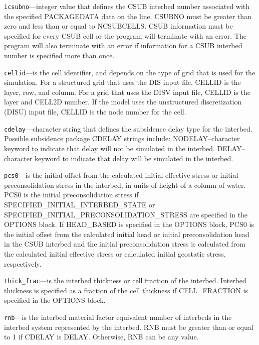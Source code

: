 \begin{description}
\item \texttt{icsubno}---integer value that defines the CSUB interbed number associated with the specified PACKAGEDATA data on the line. CSUBNO must be greater than zero and less than or equal to NCSUBCELLS.  CSUB information must be specified for every CSUB cell or the program will terminate with an error.  The program will also terminate with an error if information for a CSUB interbed number is specified more than once.

\item \texttt{cellid}---is the cell identifier, and depends on the type of grid that is used for the simulation.  For a structured grid that uses the DIS input file, CELLID is the layer, row, and column.   For a grid that uses the DISV input file, CELLID is the layer and CELL2D number.  If the model uses the unstructured discretization (DISU) input file, CELLID is the node number for the cell.

\item \texttt{cdelay}---character string that defines the subsidence delay type for the interbed. Possible subsidence package CDELAY strings include: NODELAY--character keyword to indicate that delay will not be simulated in the interbed.  DELAY--character keyword to indicate that delay will be simulated in the interbed.

\item \texttt{pcs0}---is the initial offset from the calculated initial effective stress or initial preconsolidation stress in the interbed, in units of height of a column of water. PCS0 is the initial preconsolidation stress if SPECIFIED\_INITIAL\_INTERBED\_STATE or SPECIFIED\_INITIAL\_PRECONSOLIDATION\_STRESS are specified in the OPTIONS block. If HEAD\_BASED is specified in the OPTIONS block, PCS0 is the initial offset from the calculated initial head or initial preconsolidation head in the CSUB interbed and the initial preconsolidation stress is calculated from the calculated initial effective stress or calculated initial geostatic stress, respectively.

\item \texttt{thick\_frac}---is the interbed thickness or cell fraction of the interbed. Interbed thickness is specified as a fraction of the cell thickness if CELL\_FRACTION is specified in the OPTIONS block.

\item \texttt{rnb}---is the interbed material factor equivalent number of interbeds in the interbed system represented by the interbed. RNB must be greater than or equal to 1 if CDELAY is DELAY. Otherwise, RNB can be any value.


\end{description}
